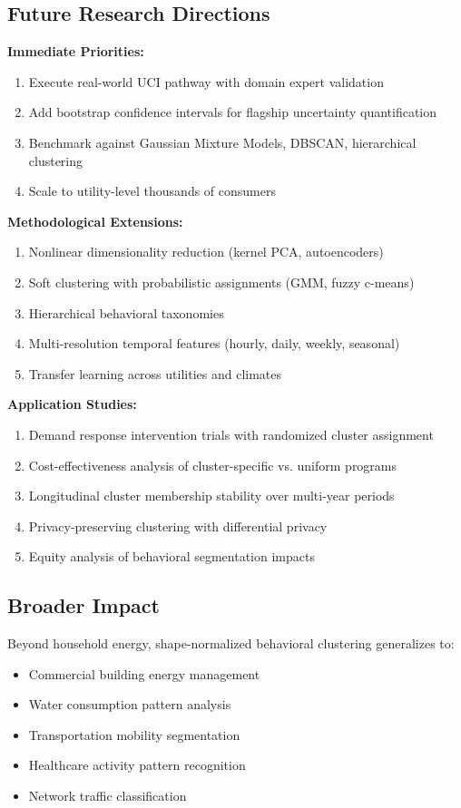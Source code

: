 \subsection{Future Research Directions}

\textbf{Immediate Priorities:}
\begin{enumerate}
    \item Execute real-world UCI pathway with domain expert validation
    \item Add bootstrap confidence intervals for flagship uncertainty quantification
    \item Benchmark against Gaussian Mixture Models, DBSCAN, hierarchical clustering
    \item Scale to utility-level thousands of consumers
\end{enumerate}

\textbf{Methodological Extensions:}
\begin{enumerate}
    \item Nonlinear dimensionality reduction (kernel PCA, autoencoders)
    \item Soft clustering with probabilistic assignments (GMM, fuzzy c-means)
    \item Hierarchical behavioral taxonomies
    \item Multi-resolution temporal features (hourly, daily, weekly, seasonal)
    \item Transfer learning across utilities and climates
\end{enumerate}

\textbf{Application Studies:}
\begin{enumerate}
    \item Demand response intervention trials with randomized cluster assignment
    \item Cost-effectiveness analysis of cluster-specific vs. uniform programs
    \item Longitudinal cluster membership stability over multi-year periods
    \item Privacy-preserving clustering with differential privacy
    \item Equity analysis of behavioral segmentation impacts
\end{enumerate}

\subsection{Broader Impact}

Beyond household energy, shape-normalized behavioral clustering generalizes to:
\begin{itemize}
    \item Commercial building energy management
    \item Water consumption pattern analysis
    \item Transportation mobility segmentation
    \item Healthcare activity pattern recognition
    \item Network traffic classification
\end{itemize}

